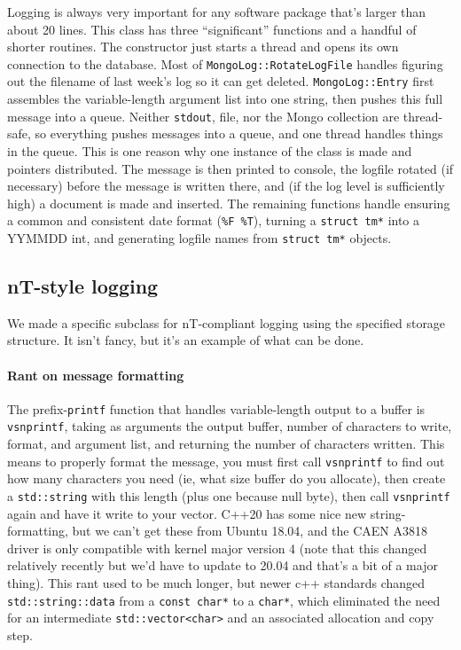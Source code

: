 Logging is always very important for any software package that's larger than about 20 lines.
This class has three ``significant'' functions and a handful of shorter routines.
The constructor just starts a thread and opens its own connection to the database.
Most of \texttt{MongoLog::RotateLogFile} handles figuring out the filename of last week's log so it can get deleted.
\texttt{MongoLog::Entry} first assembles the variable-length argument list into one string, then pushes this full message into a queue.
Neither \texttt{stdout}, file, nor the Mongo collection are thread-safe, so everything pushes messages into a queue, and one thread handles things in the queue.
This is one reason why one instance of the class is made and pointers distributed.
The message is then printed to console, the logfile rotated (if necessary) before the message is written there, and (if the log level is sufficiently high) a document is made and inserted.
The remaining functions handle ensuring a common and consistent date format (\texttt{\%F \%T}), turning a \texttt{struct tm*} into a YYMMDD int, and generating logfile names from \texttt{struct tm*} objects.

\subsection{nT-style logging}

We made a specific subclass for nT-compliant logging using the specified storage structure.
It isn't fancy, but it's an example of what can be done.

\paragraph{Rant on message formatting}
The prefix-\texttt{printf} function that handles variable-length output to a buffer is \texttt{vsnprintf}, taking as arguments the output buffer, number of characters to write, format, and argument list, and returning the number of characters written.
This means to properly format the message, you must first call \texttt{vsnprintf} to find out how many characters you need (ie, what size buffer do you allocate), then create a \texttt{std::string} with this length (plus one because null byte), then call \texttt{vsnprintf} again and have it write to your vector.
C++20 has some nice new string-formatting, but we can't get these from Ubuntu 18.04, and the CAEN A3818 driver is only compatible with kernel major version 4 (note that this changed relatively recently but we'd have to update to 20.04 and that's a bit of a major thing).
This rant used to be much longer, but newer c++ standards changed \texttt{std::string::data} from a \texttt{const char*} to a \texttt{char*}, which eliminated the need for an intermediate \texttt{std::vector<char>} and an associated allocation and copy step.

